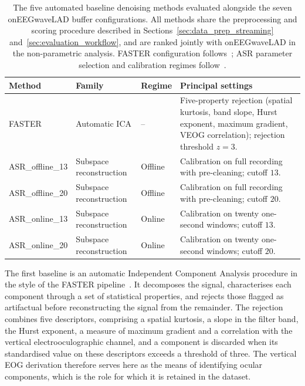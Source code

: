\documentclass[MScCS,12pt,oneside,final]{uccthesis}
\begin{document}
\begin{table}[!htb]
    \centering
    \begin{tabularx}{\textwidth}{@{} l l l X @{}}
        \toprule
        \textbf{Method} & \textbf{Family} & \textbf{Regime} & \textbf{Principal settings} \\
        \midrule
        FASTER & Automatic ICA & -- & Five-property rejection (spatial kurtosis, band slope, Hurst exponent, maximum gradient, VEOG correlation); rejection threshold $z = 3$. \\
        \addlinespace
        ASR\_offline\_13 & Subspace reconstruction & Offline & Calibration on full recording with pre-cleaning; cutoff $13$. \\
        ASR\_offline\_20 & Subspace reconstruction & Offline & Calibration on full recording with pre-cleaning; cutoff $20$. \\
        ASR\_online\_13 & Subspace reconstruction & Online & Calibration on twenty one-second windows; cutoff $13$. \\
        ASR\_online\_20 & Subspace reconstruction & Online & Calibration on twenty one-second windows; cutoff $20$. \\
        \bottomrule
    \end{tabularx}
    \caption{The five automated baseline denoising methods evaluated alongside the seven
    onEEGwaveLAD buffer configurations. All methods share the preprocessing and scoring procedure
    described in Sections~\ref{sec:data_prep_streaming} and~\ref{sec:evaluation_workflow}, and are
    ranked jointly with onEEGwaveLAD in the non-parametric analysis. FASTER configuration follows~\textcite{nolan2010faster}; ASR parameter selection and calibration regimes follow~\textcite{mullen2015real}.}
    \label{tab:baselines}
\end{table}

The first baseline is an automatic Independent Component Analysis procedure in the style of the FASTER pipeline~\parencite{nolan2010faster}. It decomposes the signal, characterises each component through a set of statistical properties, and rejects those flagged as artifactual before reconstructing the signal from the remainder. The rejection combines five descriptors, comprising a spatial kurtosis, a slope in the filter band, the Hurst exponent, a measure of maximum gradient and a correlation with the vertical electrooculographic channel, and a component is discarded when its standardised value on these descriptors exceeds a threshold of three. The vertical EOG derivation therefore serves here as the means of identifying ocular components, which is the role for which it is retained in the dataset.
\end{document}
